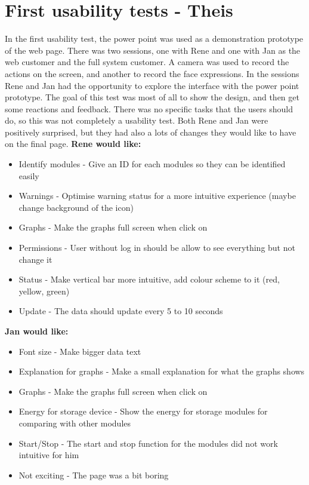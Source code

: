 \section{First usability tests - Theis}
In the first usability test, the power point was used as a demonstration prototype of the web page. There was two sessions, one with Rene and one with Jan as the web customer and the full system customer. A camera was used to record the actions on the screen, and another to record the face expressions. In the sessions Rene and Jan had the opportunity to explore the interface with the power point prototype. The goal of this test was most of all to show the design, and then get some reactions and feedback. There was no specific tasks that the users should do, so this was not completely a usability test. Both Rene and Jan were positively surprised, but they had also a lots of changes they would like to have on the final page.\p
\textbf{Rene would like:}
\begin{itemize}
	\item Identify modules - Give an ID for each modules so they can be identified easily
	\item Warnings - Optimise warning status for a more intuitive experience (maybe change background of the icon)
	\item Graphs - Make the graphs full screen when click on
	\item Permissions - User without log in should be allow to see everything but not change it
	\item Status - Make vertical bar more intuitive, add colour scheme to it (red, yellow, green)
	\item Update - The data should update every 5 to 10 seconds
\end{itemize}
\textbf{Jan would like:}
\begin{itemize}
	\item Font size - Make bigger data text
	\item Explanation for graphs - Make a small explanation for what the graphs shows
	\item Graphs - Make the graphs full screen when click on
	\item Energy for storage device - Show the energy for storage modules for comparing with other modules
	\item Start/Stop - The start and stop function for the modules did not work intuitive for him
	\item Not exciting - The page was a bit boring
\end{itemize}
